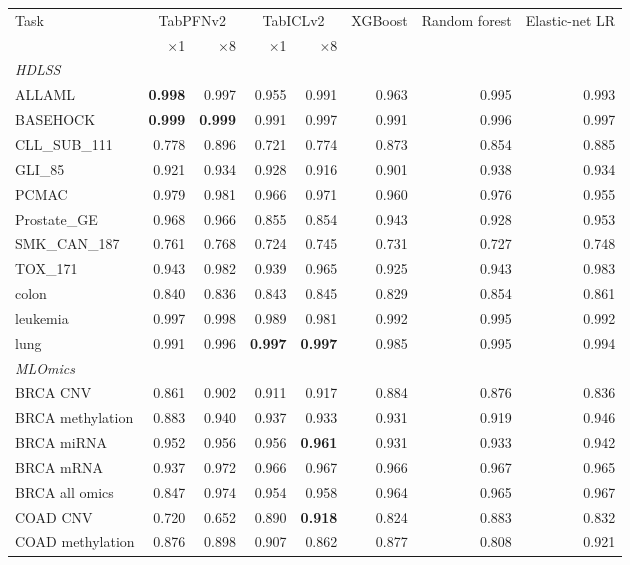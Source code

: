 \begin{tabular}{lrrrrrrr}
\toprule
Task & \multicolumn{2}{c}{TabPFNv2} & \multicolumn{2}{c}{TabICLv2} & \multicolumn{1}{c}{XGBoost} & \multicolumn{1}{c}{Random forest} & \multicolumn{1}{c}{Elastic-net LR} \\
\cmidrule(lr){2-3} \cmidrule(lr){4-5} \cmidrule(lr){6-6} \cmidrule(lr){7-7} \cmidrule(lr){8-8}
 & $\times$1 & $\times$8 & $\times$1 & $\times$8 &  &  &  \\
\midrule \multicolumn{8}{l}{\emph{HDLSS}} \\
ALLAML & \textbf{0.998} & 0.997 & 0.955 & 0.991 & 0.963 & 0.995 & 0.993 \\
BASEHOCK & \textbf{0.999} & \textbf{0.999} & 0.991 & 0.997 & 0.991 & 0.996 & 0.997 \\
CLL\_SUB\_111 & 0.778 & 0.896 & 0.721 & 0.774 & 0.873 & 0.854 & 0.885 \\
GLI\_85 & 0.921 & 0.934 & 0.928 & 0.916 & 0.901 & 0.938 & 0.934 \\
PCMAC & 0.979 & 0.981 & 0.966 & 0.971 & 0.960 & 0.976 & 0.955 \\
Prostate\_GE & 0.968 & 0.966 & 0.855 & 0.854 & 0.943 & 0.928 & 0.953 \\
SMK\_CAN\_187 & 0.761 & 0.768 & 0.724 & 0.745 & 0.731 & 0.727 & 0.748 \\
TOX\_171 & 0.943 & 0.982 & 0.939 & 0.965 & 0.925 & 0.943 & 0.983 \\
colon & 0.840 & 0.836 & 0.843 & 0.845 & 0.829 & 0.854 & 0.861 \\
leukemia & 0.997 & 0.998 & 0.989 & 0.981 & 0.992 & 0.995 & 0.992 \\
lung & 0.991 & 0.996 & \textbf{0.997} & \textbf{0.997} & 0.985 & 0.995 & 0.994 \\
\midrule \multicolumn{8}{l}{\emph{MLOmics}} \\
BRCA CNV & 0.861 & 0.902 & 0.911 & 0.917 & 0.884 & 0.876 & 0.836 \\
BRCA methylation & 0.883 & 0.940 & 0.937 & 0.933 & 0.931 & 0.919 & 0.946 \\
BRCA miRNA & 0.952 & 0.956 & 0.956 & \textbf{0.961} & 0.931 & 0.933 & 0.942 \\
BRCA mRNA & 0.937 & 0.972 & 0.966 & 0.967 & 0.966 & 0.967 & 0.965 \\
BRCA all omics & 0.847 & 0.974 & 0.954 & 0.958 & 0.964 & 0.965 & 0.967 \\
COAD CNV & 0.720 & 0.652 & 0.890 & \textbf{0.918} & 0.824 & 0.883 & 0.832 \\
COAD methylation & 0.876 & 0.898 & 0.907 & 0.862 & 0.877 & 0.808 & 0.921 \\

\end{tabular}
